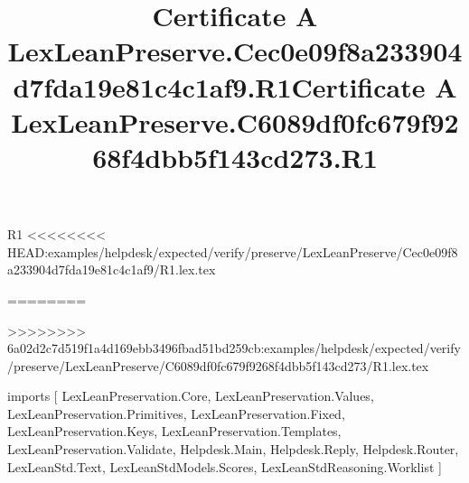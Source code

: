 \begin{lexlean}{R1}
<<<<<<<< HEAD:examples/helpdesk/expected/verify/preserve/LexLeanPreserve/Cec0e09f8a233904d7fda19e81c4c1af9/R1.lex.tex
\title{Certificate A LexLeanPreserve.Cec0e09f8a233904d7fda19e81c4c1af9.R1}
========
\title{Certificate A LexLeanPreserve.C6089df0fc679f9268f4dbb5f143cd273.R1}
>>>>>>>> 6a02d2c7d519f1a4d169ebb3496fbad51bd259cb:examples/helpdesk/expected/verify/preserve/LexLeanPreserve/C6089df0fc679f9268f4dbb5f143cd273/R1.lex.tex
\begin{coremodule}
imports [
  LexLeanPreservation.Core,
  LexLeanPreservation.Values,
  LexLeanPreservation.Primitives,
  LexLeanPreservation.Fixed,
  LexLeanPreservation.Keys,
  LexLeanPreservation.Templates,
  LexLeanPreservation.Validate,
  Helpdesk.Main,
  Helpdesk.Reply,
  Helpdesk.Router,
  LexLeanStd.Text,
  LexLeanStdModels.Scores,
  LexLeanStdReasoning.Worklist
]


\end{coremodule}
\end{lexlean}
